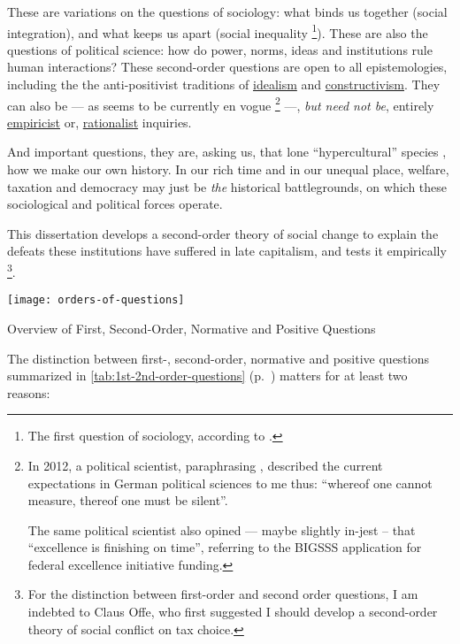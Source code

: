 These are variations on the questions of sociology: what binds us together (social integration), and what keeps us apart (social inequality
\footnote{
	The first question of sociology, according to \citet[66]{Dahrendorf1966}.
}).
These are also the questions of political science: how do power, norms, ideas and institutions rule human interactions?
These second-order questions are open to all epistemologies, including the the anti-positivist traditions of \hyperref[itm:idealism]{idealism} and \hyperref[itm:constructivism]{constructivism}.
They can also be --- as seems to be currently en vogue
\footnote{
	In 2012, a political scientist, paraphrasing \cite{Wittgenstein1998}, described the current expectations in German political sciences to me thus: ``whereof one cannot measure, thereof one must be silent''.  %

	The same political scientist also opined --- maybe slightly in-jest -- that ``excellence is finishing on time'', referring to the \gls{BIGSSS} application for federal excellence initiative funding.
}
---, \emph{but need not be}, entirely  \hyperref[itm:empiricism]{empiricist} or, \hyperref[itm:rationalism]{rationalist} inquiries.

And important questions, they are, asking us, that lone ``hypercultural'' species \citep{Henrich2004}, how we make our own history.
In our rich time and in our unequal place, welfare, taxation and democracy may just be \emph{the} historical battlegrounds, on which these sociological and political forces operate.

This dissertation develops a second-order theory of social change to explain the defeats these institutions have suffered in late capitalism, and tests it empirically
\footnote{
	For the distinction between first-order and second order questions, I am indebted to Claus Offe, who first suggested I should develop a second-order theory of social conflict on tax choice.
}.

\begin{table}[htbp]
	\centering
	\texttt{[image: orders-of-questions]}
	\caption{Overview of First, Second-Order, Normative and Positive Questions}
	\label{tab:1st-2nd-order-questions}
\end{table}

The distinction between first-, second-order, normative and positive questions summarized in \autoref{tab:1st-2nd-order-questions} (p.~\pageref{tab:1st-2nd-order-questions}) matters for at least two reasons:

